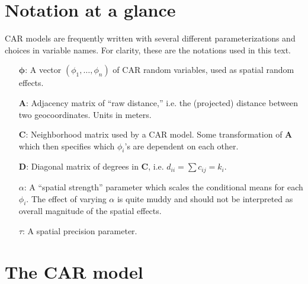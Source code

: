 \documentclass{scrartcl}
\newcommand{\mat}[1]{\bm{#1}}
\begin{document}
\section{Notation at a glance}

CAR models are frequently written with several different
parameterizations and choices in variable names. For clarity, these
are the notations used in this text.

\begin{itemize}
\item [$\mat{\phi}$:] A vector $(\phi_1,\dots, \phi_n)$ of CAR random
  variables, used as spatial random effects.
\item [$\mat{A}$:] Adjacency matrix of ``raw distance,'' i.e. the
  (projected) distance between two geocoordinates. Units in meters.
\item [$\mat{C}$:] Neighborhood matrix used by a CAR model. Some
  transformation of $\mat{A}$ which then specifies which $\phi_i$'s
  are dependent on each other.
\item [$\mat{D}$:] Diagonal matrix of degrees in $\mat{C}$,
  i.e. $d_{ii} = \sum{c_{ij}} = k_i$.
\item [$\alpha$:] A ``spatial strength'' parameter which scales the
  conditional means for each $\phi_i$. The effect of varying $\alpha$
  is quite muddy and should not be interpreted as overall magnitude
  of the spatial effects.
\item [$\tau$:] A spatial precision parameter. 
\end{itemize}



\section{The CAR model}
\label{sec:car-model}
\end{document}
